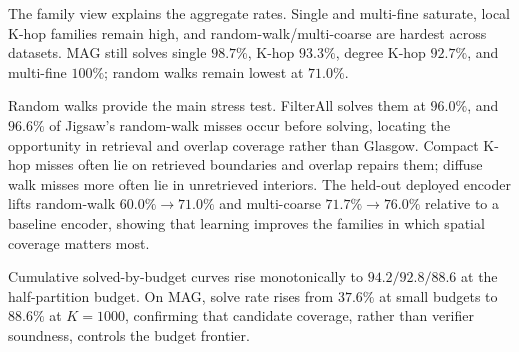 \documentclass[runningheads]{llncs}
\begin{document}
\begin{table}[H]
\centering
\caption{\textbf{Jigsaw query-family breakdown.} Positive columns report exact-solve rate; negative columns report correct no-match rate. All three datasets use the connected-positive protocol. All datasets are reported at the matched half-partition budget ($K{=}10/100/1000$); the MAG rows use the deployed MAG encoder (overall $88.6\%$).}
\label{tab:jigsaw_family}
\setlength{\tabcolsep}{3pt}
\end{table}

\label{sec:family}
The family view explains the aggregate rates. Single and multi-fine saturate, local K-hop families remain high, and random-walk/multi-coarse are hardest across datasets. MAG still solves single $98.7\%$, K-hop $93.3\%$, degree K-hop $92.7\%$, and multi-fine $100\%$; random walks remain lowest at $71.0\%$.

Random walks provide the main stress test. FilterAll solves them at $96.0\%$, and $96.6\%$ of Jigsaw's random-walk misses occur before solving, locating the opportunity in retrieval and overlap coverage rather than Glasgow. Compact K-hop misses often lie on retrieved boundaries and overlap repairs them; diffuse walk misses more often lie in unretrieved interiors. The held-out deployed encoder lifts random-walk $60.0\%\!\to\!71.0\%$ and multi-coarse $71.7\%\!\to\!76.0\%$ relative to a baseline encoder, showing that learning improves the families in which spatial coverage matters most.

Cumulative solved-by-budget curves rise monotonically to $94.2/92.8/88.6$ at the half-partition budget. On MAG, solve rate rises from $37.6\%$ at small budgets to $88.6\%$ at $K{=}1000$, confirming that candidate coverage, rather than verifier soundness, controls the budget frontier.
\end{document}
